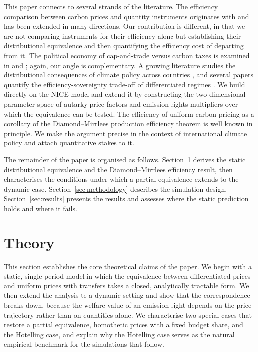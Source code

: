 \documentclass[12pt,english]{article}
\begin{document}
This paper connects to several strands of the literature. The efficiency comparison between carbon prices and quantity instruments originates with \cite{weitzman1974prices} and has been extended in many directions. Our contribution is different, in that we are not comparing instruments for their efficiency alone but establishing their distributional equivalence and then quantifying the efficiency cost of departing from it. The political economy of cap-and-trade versus carbon taxes is examined in \cite{goulder2013carbon} and \cite{stavins2019carbon}; again, our angle is
complementary. A growing literature studies the distributional consequences of climate policy across countries \citep{moritz2024, lemoigne2026}, and several papers quantify the efficiency-sovereignty trade-off of differentiated regimes \citep{bauer2020, bekkers2022}. We build directly on the NICE model \citep{youngbrun2025} and extend it by constructing the two-dimensional parameter space of autarky price factors and emission-rights multipliers over which the equivalence can be tested. The efficiency of uniform carbon pricing as a corollary of the Diamond--Mirrlees production efficiency theorem \citep{diamond1971optimal} is well known in principle. We make the argument precise in the context of international climate policy and attach quantitative stakes to it.

The remainder of the paper is organised as follows. Section~\ref{sec:theory} derives the static distributional equivalence and the Diamond--Mirrlees efficiency result, then characterises the conditions under which a partial equivalence extends to the dynamic case. Section~\ref{sec:methodology} describes the simulation design. Section~\ref{sec:results} presents the results and assesses where the static prediction holds and where it fails.


\section{Theory}
\label{sec:theory}

This section establishes the core theoretical claims of the paper. We begin with a static, single-period model in which the equivalence between differentiated prices and uniform prices with transfers takes a closed, analytically tractable form. We then extend the analysis to a dynamic setting and show that the correspondence breaks down, because the welfare value of an emission right depends on the price trajectory rather than on quantities alone. We characterise two special cases that restore a partial equivalence, homothetic prices with a fixed budget share, and the Hotelling case, and explain why the Hotelling case serves as the natural empirical benchmark for the simulations that follow.
\end{document}
